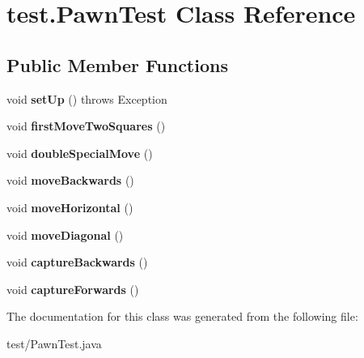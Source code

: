 \hypertarget{classtest_1_1PawnTest}{\section{test.\-Pawn\-Test Class Reference}
\label{classtest_1_1PawnTest}
}
\subsection*{Public Member Functions}
\begin{DoxyCompactItemize}
\item 
\hypertarget{classtest_1_1PawnTest_a038138f0237a3cf3fa97277a1b598c3d}{void {\bfseries set\-Up} ()  throws Exception }\label{classtest_1_1PawnTest_a038138f0237a3cf3fa97277a1b598c3d}

\item 
\hypertarget{classtest_1_1PawnTest_abfaebd7d92927bc346a5d0503553142e}{void {\bfseries first\-Move\-Two\-Squares} ()}\label{classtest_1_1PawnTest_abfaebd7d92927bc346a5d0503553142e}

\item 
\hypertarget{classtest_1_1PawnTest_af47de7fe5148efcb861173131f31bd4d}{void {\bfseries double\-Special\-Move} ()}\label{classtest_1_1PawnTest_af47de7fe5148efcb861173131f31bd4d}

\item 
\hypertarget{classtest_1_1PawnTest_a7162a87c68676b56ca56862bc44ad627}{void {\bfseries move\-Backwards} ()}\label{classtest_1_1PawnTest_a7162a87c68676b56ca56862bc44ad627}

\item 
\hypertarget{classtest_1_1PawnTest_a0fa7bcc0e50e9a1348ae44e1aa07b546}{void {\bfseries move\-Horizontal} ()}\label{classtest_1_1PawnTest_a0fa7bcc0e50e9a1348ae44e1aa07b546}

\item 
\hypertarget{classtest_1_1PawnTest_a98796865fe2a7bbb6b1fec60db13b838}{void {\bfseries move\-Diagonal} ()}\label{classtest_1_1PawnTest_a98796865fe2a7bbb6b1fec60db13b838}

\item 
\hypertarget{classtest_1_1PawnTest_a46389bae6735e2b0bf7b00ebf6f119a6}{void {\bfseries capture\-Backwards} ()}\label{classtest_1_1PawnTest_a46389bae6735e2b0bf7b00ebf6f119a6}

\item 
\hypertarget{classtest_1_1PawnTest_a68ccfe29dcb6f2447670c19bf4dfde7a}{void {\bfseries capture\-Forwards} ()}\label{classtest_1_1PawnTest_a68ccfe29dcb6f2447670c19bf4dfde7a}

\end{DoxyCompactItemize}


The documentation for this class was generated from the following file\-:\begin{DoxyCompactItemize}
\item 
test/Pawn\-Test.\-java\end{DoxyCompactItemize}
